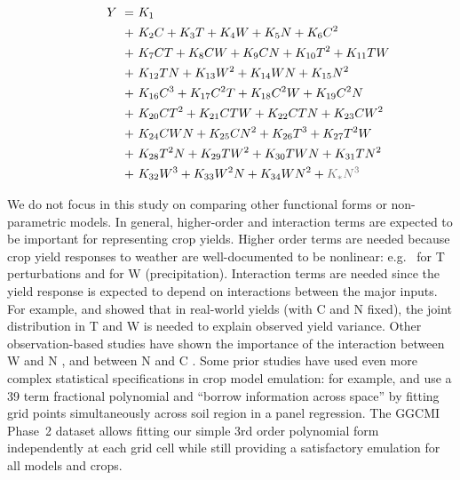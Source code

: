 \documentclass[gmdd]{copernicus} %
\begin{document}
\vspace{-0.3in}
\begin{align}
    \hspace{10mm}  \label{eqn:features_original}
        Y\ = \ & K_{1} \\
        + \ & K_{2} C      + K_{3} T      + K_{4} W      + K_{5} N    + K_{6} C^2       \nonumber \\
        + \ & K_{7} C T    + K_{8} C W    + K_{9} C N    + K_{10} T^2 + K_{11} T W      \nonumber \\
        + \ & K_{12} T N   + K_{13} W^2   + K_{14} W N   + K_{15} N^2                   \nonumber \\
        + \ & K_{16} C^3   + K_{17} C^2 T + K_{18} C^2 W + K_{19} C^2 N                 \nonumber \\
        + \ & K_{20} C T^2 + K_{21} C T W + K_{22} C T N + K_{23} C W^2                 \nonumber \\
        + \ & K_{24} C W N + K_{25} C N^2 + K_{26} T^3   + K_{27} T^2 W                 \nonumber \\
        + \ & K_{28} T^2 N + K_{29} T W^2 + K_{30} T W N + K_{31} T N^2                 \nonumber \\
        + \ & K_{32} W^3   + K_{33} W^2 N + K_{34} W N^2 + {\color{dark-gray}K_{*} N^3} \nonumber
\end{align}

We do not focus in this study on comparing other functional forms or non-parametric models.
In general, higher-order and interaction terms are expected to be important for representing crop yields. Higher order terms are needed because crop yield responses to weather are well-documented to be nonlinear: e.g.\ \citet{Schlenker2009} for T perturbations and \citet{He2016} for W (precipitation). 
Interaction terms are needed since the yield response is expected to depend on interactions between the major inputs. 
For example, \citet{Lobell2007} and \citet{Tebaldi2008} showed that in real-world yields (with C and N fixed), the joint distribution in T and W is needed to explain observed yield variance.  
Other observation-based studies have shown the importance of the interaction between W and N \citep[e.g.][]{AULAKH2005}, and between N and C \citep{Mitsuru92, Nakamura97}.
Some prior studies have used even more complex statistical specifications in crop model emulation: for example, \citet{BLANC2015} and \citet{BLANC2017} use a 39 term fractional polynomial and ``borrow information across space'' by fitting grid points simultaneously across soil region in a panel regression. 
The GGCMI Phase~2 dataset allows fitting our simple 3rd order polynomial form independently at each grid cell while still providing a satisfactory emulation for all models and crops. 
\end{document}
